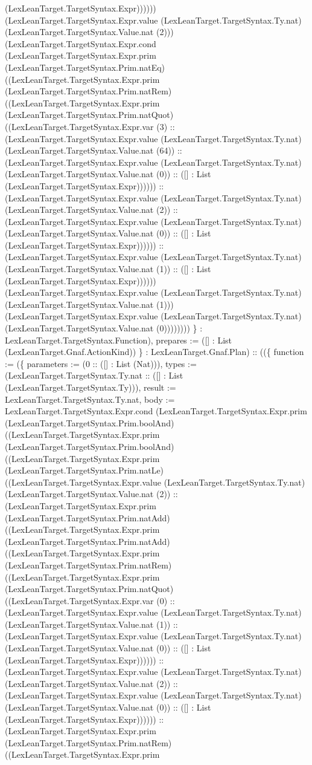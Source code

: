 \documentclass[11pt]{article}
\begin{document}
(LexLeanTarget.TargetSyntax.Expr)))))) (LexLeanTarget.TargetSyntax.Expr.value (LexLeanTarget.TargetSyntax.Ty.nat) (LexLeanTarget.TargetSyntax.Value.nat (2))) (LexLeanTarget.TargetSyntax.Expr.cond (LexLeanTarget.TargetSyntax.Expr.prim (LexLeanTarget.TargetSyntax.Prim.natEq) ((LexLeanTarget.TargetSyntax.Expr.prim (LexLeanTarget.TargetSyntax.Prim.natRem) ((LexLeanTarget.TargetSyntax.Expr.prim (LexLeanTarget.TargetSyntax.Prim.natQuot) ((LexLeanTarget.TargetSyntax.Expr.var (3) :: (LexLeanTarget.TargetSyntax.Expr.value (LexLeanTarget.TargetSyntax.Ty.nat) (LexLeanTarget.TargetSyntax.Value.nat (64)) :: (LexLeanTarget.TargetSyntax.Expr.value (LexLeanTarget.TargetSyntax.Ty.nat) (LexLeanTarget.TargetSyntax.Value.nat (0)) :: ([] : List (LexLeanTarget.TargetSyntax.Expr)))))) :: (LexLeanTarget.TargetSyntax.Expr.value (LexLeanTarget.TargetSyntax.Ty.nat) (LexLeanTarget.TargetSyntax.Value.nat (2)) :: (LexLeanTarget.TargetSyntax.Expr.value (LexLeanTarget.TargetSyntax.Ty.nat) (LexLeanTarget.TargetSyntax.Value.nat (0)) :: ([] : List (LexLeanTarget.TargetSyntax.Expr)))))) :: (LexLeanTarget.TargetSyntax.Expr.value (LexLeanTarget.TargetSyntax.Ty.nat) (LexLeanTarget.TargetSyntax.Value.nat (1)) :: ([] : List (LexLeanTarget.TargetSyntax.Expr)))))) (LexLeanTarget.TargetSyntax.Expr.value (LexLeanTarget.TargetSyntax.Ty.nat) (LexLeanTarget.TargetSyntax.Value.nat (1))) (LexLeanTarget.TargetSyntax.Expr.value (LexLeanTarget.TargetSyntax.Ty.nat) (LexLeanTarget.TargetSyntax.Value.nat (0)))))))) \} : LexLeanTarget.TargetSyntax.Function), prepares := ([] : List (LexLeanTarget.Gnaf.ActionKind)) \} : LexLeanTarget.Gnaf.Plan) :: ((\{ function := (\{ parameters := (0 :: ([] : List (Nat))), types := (LexLeanTarget.TargetSyntax.Ty.nat :: ([] : List (LexLeanTarget.TargetSyntax.Ty))), result := LexLeanTarget.TargetSyntax.Ty.nat, body := LexLeanTarget.TargetSyntax.Expr.cond (LexLeanTarget.TargetSyntax.Expr.prim (LexLeanTarget.TargetSyntax.Prim.boolAnd) ((LexLeanTarget.TargetSyntax.Expr.prim (LexLeanTarget.TargetSyntax.Prim.boolAnd) ((LexLeanTarget.TargetSyntax.Expr.prim (LexLeanTarget.TargetSyntax.Prim.natLe) ((LexLeanTarget.TargetSyntax.Expr.value (LexLeanTarget.TargetSyntax.Ty.nat) (LexLeanTarget.TargetSyntax.Value.nat (2)) :: (LexLeanTarget.TargetSyntax.Expr.prim (LexLeanTarget.TargetSyntax.Prim.natAdd) ((LexLeanTarget.TargetSyntax.Expr.prim (LexLeanTarget.TargetSyntax.Prim.natAdd) ((LexLeanTarget.TargetSyntax.Expr.prim (LexLeanTarget.TargetSyntax.Prim.natRem) ((LexLeanTarget.TargetSyntax.Expr.prim (LexLeanTarget.TargetSyntax.Prim.natQuot) ((LexLeanTarget.TargetSyntax.Expr.var (0) :: (LexLeanTarget.TargetSyntax.Expr.value (LexLeanTarget.TargetSyntax.Ty.nat) (LexLeanTarget.TargetSyntax.Value.nat (1)) :: (LexLeanTarget.TargetSyntax.Expr.value (LexLeanTarget.TargetSyntax.Ty.nat) (LexLeanTarget.TargetSyntax.Value.nat (0)) :: ([] : List (LexLeanTarget.TargetSyntax.Expr)))))) :: (LexLeanTarget.TargetSyntax.Expr.value (LexLeanTarget.TargetSyntax.Ty.nat) (LexLeanTarget.TargetSyntax.Value.nat (2)) :: (LexLeanTarget.TargetSyntax.Expr.value (LexLeanTarget.TargetSyntax.Ty.nat) (LexLeanTarget.TargetSyntax.Value.nat (0)) :: ([] : List (LexLeanTarget.TargetSyntax.Expr)))))) :: (LexLeanTarget.TargetSyntax.Expr.prim (LexLeanTarget.TargetSyntax.Prim.natRem) ((LexLeanTarget.TargetSyntax.Expr.prim 
\end{document}
